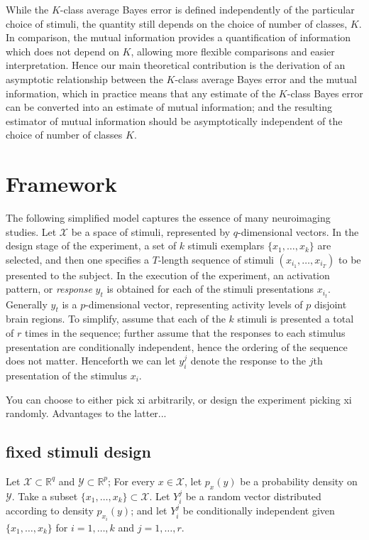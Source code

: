 \documentclass[12pt]{article}
\begin{document}
While the $K$-class average Bayes error is defined independently of the particular choice of stimuli,
the quantity still depends on the choice of number of classes, $K$.
In comparison, the mutual information provides a quantification of information which does not depend on $K$,
allowing more flexible comparisons and easier interpretation.
Hence our main theoretical contribution is the derivation of an asymptotic relationship between the $K$-class average Bayes error
and the mutual information, which in practice means that any estimate of the $K$-class Bayes error can be converted into an estimate of mutual information;
and the resulting estimator of mutual information should be asymptotically independent of the choice of number of classes $K$.

\section{Framework}

The following simplified model captures the essence of many
neuroimaging studies.  Let $\mathcal{X}$ be a space of stimuli,
represented by $q$-dimensional vectors.  In the design stage of the
experiment, a set of $k$ stimuli exemplars $\{x_1,\hdots, x_k\}$ are
selected, and then one specifies a $T$-length sequence of stimuli $(
x_{i_1},\hdots, x_{i_T} )$ to be presented to the subject.  In the
execution of the experiment, an activation pattern, or \emph{response}
$y_t$ is obtained for each of the stimuli presentations $x_{i_t}$.
Generally $y_t$ is a $p$-dimensional vector, representing activity
levels of $p$ disjoint brain regions.  To simplify, assume that each
of the $k$ stimuli is presented a total of $r$ times in the sequence;
further assume that the responses to each stimulus presentation are
conditionally independent, hence the ordering of the sequence does not
matter.  Henceforth we can let $y_i^j$ denote the response to the
$j$th presentation of the stimulus $x_i$.

You can choose to either pick xi arbitrarily, or design the experiment picking xi randomly.
Advantages to the latter...

\subsection{fixed stimuli design}


Let
$\mathcal{X} \subset \mathbb{R}^q$ and
$\mathcal{Y} \subset \mathbb{R}^p$; 
For every $x \in \mathcal{X}$, let $p_x(y)$
be a probability density on $\mathcal{Y}$.  
Take a subset
$\{x_1,\hdots, x_k\} \subset \mathcal{X}$.
Let $Y_i^j$ be a random
vector distributed according to density $p_{x_i}(y)$; and let $Y_i^j$
be conditionally independent given $\{x_1,\hdots, x_k\}$ for $i =
1,\hdots, k$ and $j = 1, \hdots, r.$
 
\end{document}
